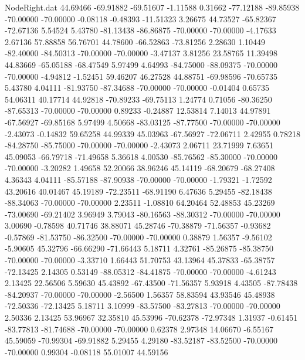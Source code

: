 \begin{filecontents}{NodeRight.dat}
  44.69466  -69.91882  -69.51607    -1.11588    0.31662  -77.12188  -89.85938  -70.00000  -70.00000   -0.08118   -0.48393  -11.51323    3.26675
  44.73527  -65.82367  -72.67136     5.54524    5.43780  -81.13438  -86.86875  -70.00000  -70.00000   -4.17633    2.67136   57.88858   56.76701
  44.78600  -66.52863  -73.81256     2.28630    1.10449  -82.40000  -84.50313  -70.00000  -70.00000   -3.47137    3.81256   23.58765   11.39498
  44.83669  -65.05188  -68.47549     5.97499    4.64993  -84.75000  -88.09375  -70.00000  -70.00000   -4.94812   -1.52451   59.46207   46.27528
  44.88751  -69.98596  -70.65735     5.43780    4.04111  -81.93750  -87.34688  -70.00000  -70.00000   -0.01404    0.65735   54.06311   40.17714
  44.92818  -70.89233  -69.75113     1.24774    0.71056  -80.36250  -87.65313  -70.00000  -70.00000    0.89233   -0.24887   12.53814    7.14013
  44.97891  -67.56927  -69.85168     5.97499    4.50668  -83.03125  -87.77500  -70.00000  -70.00000   -2.43073   -0.14832   59.65258   44.99339
  45.03963  -67.56927  -72.06711     2.42955    0.78218  -84.28750  -85.75000  -70.00000  -70.00000   -2.43073    2.06711   23.71999    7.63651
  45.09053  -66.79718  -71.49658     5.36618    4.00530  -85.76562  -85.30000  -70.00000  -70.00000   -3.20282    1.49658   52.20066   38.96246
  45.14119  -68.20679  -68.27408     4.36343    4.04111  -85.57188  -87.90938  -70.00000  -70.00000   -1.79321   -1.72592   43.20616   40.01467
  45.19189  -72.23511  -68.91190     6.47636    5.29455  -82.18438  -88.34063  -70.00000  -70.00000    2.23511   -1.08810   64.20464   52.48853
  45.23269  -73.00690  -69.21402     3.96949    3.79043  -80.16563  -88.30312  -70.00000  -70.00000    3.00690   -0.78598   40.71746   38.88071
  45.28746  -70.38879  -71.56357    -0.93682   -0.57869  -81.53750  -86.32500  -70.00000  -70.00000    0.38879    1.56357   -9.56102   -5.90605
  45.32796  -66.66290  -71.66443     5.18711    4.32761  -85.26875  -85.38750  -70.00000  -70.00000   -3.33710    1.66443   51.70753   43.13964
  45.37833  -65.38757  -72.13425     2.14305    0.53149  -88.05312  -84.41875  -70.00000  -70.00000   -4.61243    2.13425   22.56506    5.59630
  45.43892  -67.43500  -71.56357     5.93918    4.43505  -87.78438  -84.20937  -70.00000  -70.00000   -2.56500    1.56357   58.83594   43.93546
  45.48938  -72.50336  -72.13425     5.18711    3.10999  -83.57500  -83.27813  -70.00000  -70.00000    2.50336    2.13425   53.96967   32.35810
  45.53996  -70.62378  -72.97348     1.31937   -0.61451  -83.77813  -81.74688  -70.00000  -70.00000    0.62378    2.97348   14.06670   -6.55167
  45.59059  -70.99304  -69.91882     5.29455    4.29180  -83.52187  -83.52500  -70.00000  -70.00000    0.99304   -0.08118   55.01007   44.59156

\end{filecontents}
